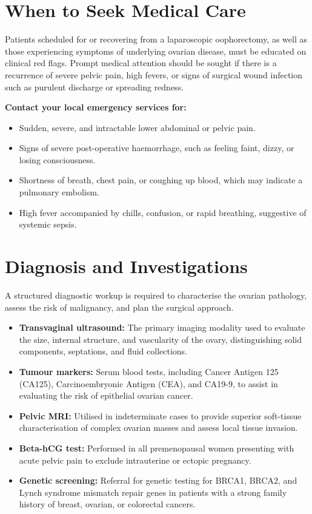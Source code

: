\section*{When to Seek Medical Care}
Patients scheduled for or recovering from a laparoscopic oophorectomy, as well as those experiencing symptoms of underlying ovarian disease, must be educated on clinical red flags. Prompt medical attention should be sought if there is a recurrence of severe pelvic pain, high fevers, or signs of surgical wound infection such as purulent discharge or spreading redness.

\textbf{Contact your local emergency services for:}
\begin{itemize}
    \item Sudden, severe, and intractable lower abdominal or pelvic pain.
    \item Signs of severe post-operative haemorrhage, such as feeling faint, dizzy, or losing consciousness.
    \item Shortness of breath, chest pain, or coughing up blood, which may indicate a pulmonary embolism.
    \item High fever accompanied by chills, confusion, or rapid breathing, suggestive of systemic sepsis.
\end{itemize}

\section*{Diagnosis and Investigations}
A structured diagnostic workup is required to characterise the ovarian pathology, assess the risk of malignancy, and plan the surgical approach.
\begin{itemize}
    \item \textbf{Transvaginal ultrasound:} The primary imaging modality used to evaluate the size, internal structure, and vascularity of the ovary, distinguishing solid components, septations, and fluid collections.
    \item \textbf{Tumour markers:} Serum blood tests, including Cancer Antigen 125 (CA125), Carcinoembryonic Antigen (CEA), and CA19-9, to assist in evaluating the risk of epithelial ovarian cancer.
    \item \textbf{Pelvic MRI:} Utilised in indeterminate cases to provide superior soft-tissue characterisation of complex ovarian masses and assess local tissue invasion.
    \item \textbf{Beta-hCG test:} Performed in all premenopausal women presenting with acute pelvic pain to exclude intrauterine or ectopic pregnancy.
    \item \textbf{Genetic screening:} Referral for genetic testing for BRCA1, BRCA2, and Lynch syndrome mismatch repair genes in patients with a strong family history of breast, ovarian, or colorectal cancers.
\end{itemize}

